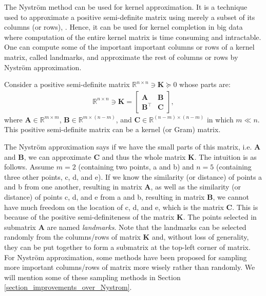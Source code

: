 \documentclass[lang=cn,10pt]{gorgeousnbook}
\numberwithin{equation}{section}%
\numberwithin{figure}{section}%
\begin{document}
The Nystr{\"o}m method can be used for kernel approximation. 
It is a technique used to approximate a positive semi-definite matrix using merely a subset of its columns (or rows), \cite{drineas2005nystrom}. 
Hence, it can be used for kernel completion in big data where computation of the entire kernel matrix is time consuming and intractable. One can compute some of the important important columns or rows of a kernel matrix, called landmarks, and approximate the rest of columns or rows by Nystr{\"o}m approximation.

Consider a positive semi-definite matrix $\mathbb{R}^{n \times n} \ni \boldsymbol{K} \succeq 0$ whose parts are:
\begin{align}\label{equation_Nystrom_partions}
\mathbb{R}^{n \times n} \ni \boldsymbol{K} = 
\left[
\begin{array}{c|c}
\boldsymbol{A} & \boldsymbol{B} \\
\hline
\boldsymbol{B}^\top & \boldsymbol{C}
\end{array}
\right],
\end{align}
where $\boldsymbol{A} \in \mathbb{R}^{m \times m}$, $\boldsymbol{B} \in \mathbb{R}^{m \times (n-m)}$, and $\boldsymbol{C} \in \mathbb{R}^{(n-m) \times (n-m)}$ in which $m \ll n$. 
This positive semi-definite matrix can be a kernel (or Gram) matrix. 

The Nystr{\"o}m approximation says if we have the small parts of this matrix, i.e. $\boldsymbol{A}$ and $\boldsymbol{B}$, we can approximate $\boldsymbol{C}$ and thus the whole matrix $\boldsymbol{K}$. The intuition is as follows. Assume $m=2$ (containing two points, a and b) and $n=5$ (containing three other points, c, d, and e). If we know the similarity (or distance) of points a and b from one another, resulting in matrix $\boldsymbol{A}$, as well as the similarity (or distance) of points c, d, and e from a and b, resulting in matrix $\boldsymbol{B}$, we cannot have much freedom on the location of c, d, and e, which is the matrix $\boldsymbol{C}$. This is because of the positive semi-definiteness of the matrix $\boldsymbol{K}$. 
The points selected in submatrix $\boldsymbol{A}$ are named \textit{landmarks}. Note that the landmarks can be selected randomly from the columns/rows of matrix $\boldsymbol{K}$ and, without loss of generality, they can be put together to form a submatrix at the top-left corner of matrix. 
For Nystr{\"o}m approximation, some methods have been proposed for sampling more important columns/rows of matrix more wisely rather than randomly. We will mention some of these sampling methods in Section \ref{section_improvements_over_Nystrom}.
\end{document}
